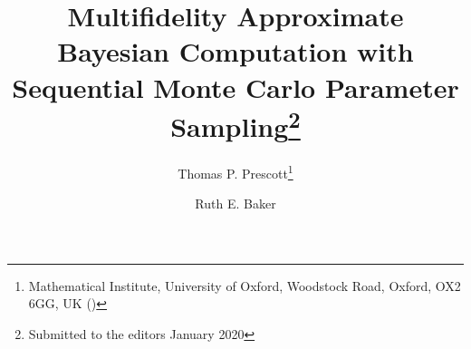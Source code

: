 \usepackage{amssymb, amsmath}
\usepackage{algorithmic}
\usepackage{cleveref}
\usepackage[demo]{graphicx}
\usepackage[caption=false]{subfig}


\usepackage{enumitem}



\title{Multifidelity Approximate Bayesian Computation with Sequential Monte Carlo Parameter Sampling\thanks{
Submitted to the editors January 2020 }}

\author{
Thomas P. Prescott\thanks{Mathematical Institute, University of Oxford, Woodstock Road, Oxford, OX2 6GG, UK ()}
\and Ruth E. Baker\footnotemark[2]
}



\newcommand{\obs}[1]{#1_{\mathrm{obs}}}
\newcommand{\tp}[1]{#1_{\mathrm{tp}}}
\newcommand{\fp}[1]{#1_{\mathrm{fp}}}
\newcommand{\fn}[1]{#1_{\mathrm{fn}}}
\renewcommand{\algorithmicrequire}{\textbf{Input:}}
\renewcommand{\algorithmicensure}{\textbf{Output:}}

\graphicspath{{figs/out/png/}}
